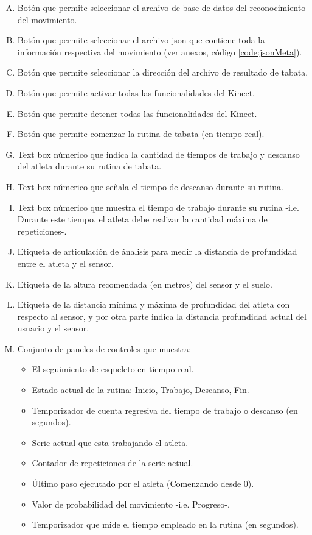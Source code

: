 \begin{enumerate}[A.]
    \item Bot\'on que permite seleccionar el archivo de base de datos del reconocimiento del movimiento.
    \item Bot\'on que permite seleccionar el archivo json que contiene toda la informaci\'on respectiva del movimiento (ver anexos, c\'odigo  \ref{code:jsonMeta}).
    \item Bot\'on que permite seleccionar la direcci\'on del archivo de resultado de tabata.
    \item Bot\'on que permite activar todas las funcionalidades del Kinect.    
    \item Bot\'on que permite detener todas las funcionalidades del Kinect. 
    \item Bot\'on que permite comenzar la rutina de tabata (en tiempo real).
   \item  Text box n\'umerico que indica la cantidad de tiempos de trabajo y descanso del atleta durante su rutina de tabata.
   \item  Text box n\'umerico que se\~nala el tiempo de descanso durante su rutina.
   \item  Text box n\'umerico que muestra el tiempo de trabajo durante su rutina -i.e. Durante este tiempo, el atleta debe realizar la cantidad m\'axima de repeticiones-.
   \item  Etiqueta de articulaci\'on de \'analisis para medir la distancia de profundidad entre el atleta y el sensor.
   \item  Etiqueta de la altura  recomendada (en metros)  del sensor y el suelo.
      \item  Etiqueta de la distancia m\'inima y m\'axima de profundidad del atleta con respecto al sensor, y por otra parte indica la distancia profundidad actual del usuario y el sensor.
      \item Conjunto de paneles de controles que muestra:
      \begin{itemize}
            \item  El seguimiento de esqueleto en tiempo real.
            \item  Estado actual de la rutina: Inicio, Trabajo, Descanso, Fin.
            \item  Temporizador de cuenta regresiva del tiempo de trabajo o descanso (en segundos).
             \item  Serie actual que esta trabajando el atleta.
             \item  Contador de repeticiones de la serie actual.
              \item \'Ultimo paso ejecutado por el atleta (Comenzando desde 0).   
             \item  Valor de probabilidad del movimiento -i.e. Progreso-.
             \item  Temporizador que mide el tiempo    empleado en la rutina (en segundos).
      \end{itemize}
\end{enumerate}
